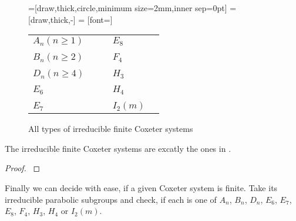 \begin{figure}
	\label{finite-coxeter-systems}
	\centering
	=[draw,thick,circle,minimum size=2mm,inner sep=0pt]
	 = [draw,thick,-]
	 = [font=\small]

	\begin{tabular}{MMcMM}
	$A_n (n \geq 1)$
	&
	\An
	&
	\hspace*{\cgpadh}
	&
	$E_8$
	&
	\Eeight
	\\
	\vspace*{\cgpadv}
	\\
	$B_n (n \geq 2)$
	&
	\Bn
	&
	\hspace*{\cgpadh}
	&
	$F_4$
	&
	\Ffour
	\\
	\vspace*{\cgpadv}
	\\
	$D_n (n \geq 4)$
	&
	\Dn
	&
	\hspace*{\cgpadh}
	&
	$H_3$
	&
	\Hthree
	\\
	\vspace*{\cgpadv}
	\\
	$E_6$
	&
	\Esix
	&
	\hspace*{\cgpadh}
	&
	$H_4$
	&
	\Hfour
	\\
	\vspace*{\cgpadv}
	\\
	$E_7$
	&
	\Eseven
	&
	\hspace*{\cgpadh}
	&
	$I_2(m)$
	&
	\Itwom
	\end{tabular}
	\caption{All types of irreducible finite Coxeter systems}
\end{figure}

\begin{theo}
	\label{irreducible-finit-coxeter-systems}
	The irreducible finite Coxeter systems are excatly the ones in .

	\begin{proof}
		\cite[Theorem 6.4]{humphreys:coxeter}
	\end{proof}
\end{theo}

Finally we can decide with ease, if a given Coxeter system is finite. Take its irreducible parabolic subgroups and check, if each is one of $A_n$, $B_n$, $D_n$, $E_6$, $E_7$, $E_8$, $F_4$, $H_3$, $H_4$ or $I_2(m)$.